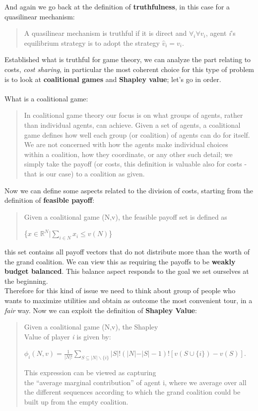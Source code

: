 \documentclass{article}
\begin{document}
{And again we go back at the definition of \textbf{truthfulness}, in this case for a quasilinear mechanism:
\begin{quote}
    A quasilinear mechanism is truthful if it is direct and $\forall _i \forall v_i$, agent \textit{i}'s equilibrium strategy is to adopt the strategy $\hat{v}_i = v_i$.
\end{quote}
Established what is truthful for game theory, we can analyze the part relating to costs, \textit{cost sharing}, in particular the most coherent choice for this type of problem is to look at  \textbf{coalitional games} and \textbf{Shapley value}; let's go in order.\\\\
What is a coalitional game:
\begin{quote}
    In coalitional game theory our focus is on what groups of agents, rather than individual agents, can achieve. Given a set of agents, a coalitional game defines how well each group (or coalition) of agents can do for itself. We are not concerned with how the agents make individual choices \\within a coalition, how they coordinate, or any other such detail; we simply take the payoff (or costs, this definition is valuable also for costs - that is our case) to a coalition as given.
\end{quote}
Now we can define some aspects related to the division of costs, starting from the definition of \textbf{feasible payoff}:
\begin{quote}
    Given a coalitional game (N,v), the feasible payoff set is defined as 
    \begin{center}
        \{$x \in \mathbb{R}^N \vert \sum_{i\in N} x_i \le v(N)$\}
    \end{center}
\end{quote}
this set contains all payoff vectors that do not distribute more than the worth of the grand coalition. We can view this as requiring the payoffs to be \textbf{weakly budget balanced}. This balance aspect responds to the goal we set ourselves at the beginning.
\\Therefore for this kind of issue we need to think about group of people who wants to maximize utilities and obtain as outcome the most convenient tour, in a \textit{fair} way. Now we can exploit the definition of \textbf{Shapley Value}:
\begin{quote}
    Given a coalitional game (N,v), the Shapley \\Value of player \textit{i} is given by:
    \begin{center}
    \normalsize{
        $\phi_i(N,v) = \frac{1}{\vert N \vert !} \displaystyle \sum_{S \subseteq \vert N \vert \backslash \{i\}} \vert S \vert!(\vert N \vert -  \vert S \vert - 1)! [v(S \cup \{i\}) - v(S)]$.
    }
    \end{center}
    This expression can be viewed as capturing \\the “average marginal contribution” of agent i, where we average over all the different sequences according to which the grand coalition could be built up from the empty coalition.
\end{quote}
}
\end{document}
